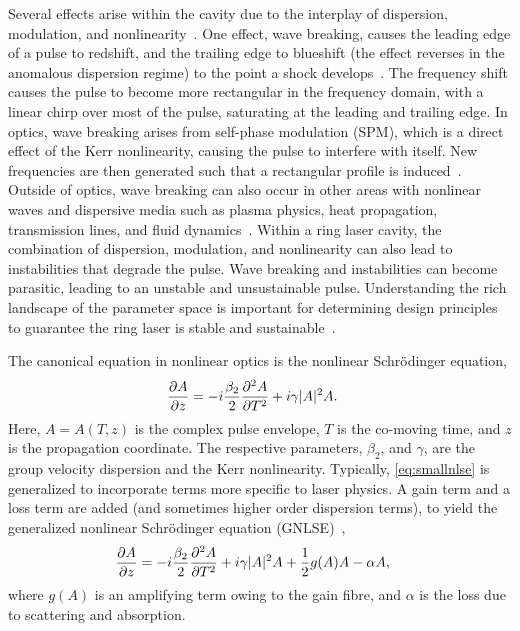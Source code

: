 \documentclass[9pt,twocolumn,twoside]{osajnl}
\newcommand{\pdiff}[3][\hspace{-0.5pt}]{\frac{\partial^{#1}#2}{\partial{#3}^{#1}}} %
\begin{document}
Several effects arise within the cavity due to the interplay of dispersion, modulation, and nonlinearity~\cite{bohun2015, coen1997, lapre2019, meng2020, oktem2010, shao2019, woodward2018}. One effect, wave breaking, causes the leading edge of a pulse to redshift, and the trailing edge to blueshift (the effect reverses in the anomalous dispersion regime) to the point a shock develops~\cite{anderson1992, rothenberg1989a, rothenberg1989b, tomlinson1984, tomlinson1985}. The frequency shift causes the pulse to become more rectangular in the frequency domain, with a linear chirp over most of the pulse, saturating at the leading and trailing edge. In optics, wave breaking arises from self-phase modulation (SPM), which is a direct effect of the Kerr nonlinearity, causing the pulse to interfere with itself. New frequencies are then generated such that a rectangular profile is induced~\cite{agrawal2013, woodward2018}. Outside of optics, wave breaking can also occur in other areas with nonlinear waves and dispersive media such as plasma physics, heat propagation, transmission lines, and fluid dynamics~\cite{coen1997, rothenberg1989b}. Within a ring laser cavity, the combination of dispersion, modulation, and nonlinearity can also lead to instabilities that degrade the pulse. Wave breaking and instabilities can become parasitic, leading to an unstable and unsustainable pulse. Understanding the rich landscape of the parameter space is important for determining design principles to guarantee the ring laser is stable and sustainable~\cite{bohun2015, burgoyneemail, finot2008, lapre2019, woodward2018}.

The canonical equation in nonlinear optics is the nonlinear Schr\"odinger equation,
\begin{align}
	\pdiff{A}{z} &= - i \frac{\beta_2}{2}\pdiff[2]{A}{T} + i \gamma |A|^2 A.
	\label{eq:smallnlse}
\end{align}
Here, $A = A(T, z)$ is the complex pulse envelope, $T$ is the co-moving time, and $z$ is the propagation coordinate. The respective parameters, $\beta_2$, and $\gamma$, are the group velocity dispersion and the Kerr nonlinearity. Typically, \eqref{eq:smallnlse} is generalized to incorporate terms more specific to laser physics. A gain term and a loss term are added (and sometimes higher order dispersion terms), to yield the generalized nonlinear Schr\"odinger equation (GNLSE)~\cite{agrawal2013, bohun2015, finot2008, peng2018, shtyrina2017, yarutkina2013},
	\begin{align}
	\pdiff{A}{z} &= - i \frac{\beta_2}{2}\pdiff[2]{A}{T} + i \gamma |A|^2 A + \frac{1}{2}g(A) A - \alpha A,
	\label{eq:nlse}
\end{align}
where $g(A)$ is an amplifying term owing to the gain fibre, and $\alpha$ is the loss due to scattering and absorption.
\end{document}
